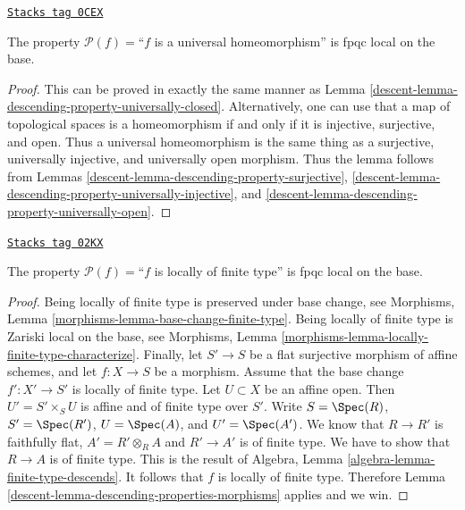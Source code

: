 \begin{lemma}
\label{descent-lemma-descending-property-universal-homeomorphism}
\href{https://stacks.math.columbia.edu/tag/0CEX}{\texttt{Stacks tag 0CEX}}

The property $\mathcal{P}(f) =$``$f$ is a universal homeomorphism''
is fpqc local on the base.
\end{lemma}

\begin{proof}

This can be proved in exactly the same manner as
Lemma \ref{descent-lemma-descending-property-universally-closed}.
Alternatively, one can use that
a map of topological spaces is a homeomorphism if and only if
it is injective, surjective, and open. Thus
a universal homeomorphism is the same thing as a
surjective, universally injective, and universally open morphism.
Thus the lemma follows from
Lemmas \ref{descent-lemma-descending-property-surjective},
\ref{descent-lemma-descending-property-universally-injective}, and
\ref{descent-lemma-descending-property-universally-open}.
\end{proof}

\begin{lemma}
\label{descent-lemma-descending-property-locally-finite-type}
\href{https://stacks.math.columbia.edu/tag/02KX}{\texttt{Stacks tag 02KX}}

The property $\mathcal{P}(f) =$``$f$ is locally of finite type''
is fpqc local on the base.
\end{lemma}

\begin{proof}

Being locally of finite type is preserved under base change, see
Morphisms, Lemma \ref{morphisms-lemma-base-change-finite-type}.
Being locally of finite type is Zariski local on the base, see
Morphisms, Lemma \ref{morphisms-lemma-locally-finite-type-characterize}.
Finally, let
$S' \to S$ be a flat surjective morphism of affine schemes,
and let $f : X \to S$ be a morphism. Assume that the base change
$f' : X' \to S'$ is locally of finite type.
Let $U \subset X$ be an affine open. Then $U' = S' \times_S U$
is affine and of finite type over $S'$. Write
$S = \Spec(R)$,
$S' = \Spec(R')$,
$U = \Spec(A)$, and
$U' = \Spec(A')$.
We know that $R \to R'$ is faithfully flat,
$A' = R' \otimes_R A$ and $R' \to A'$ is of finite type.
We have to show that $R \to A$ is of finite type.
This is the result of
Algebra, Lemma \ref{algebra-lemma-finite-type-descends}.
It follows that $f$ is locally of finite type.
Therefore Lemma \ref{descent-lemma-descending-properties-morphisms} applies and we win.
\end{proof}

